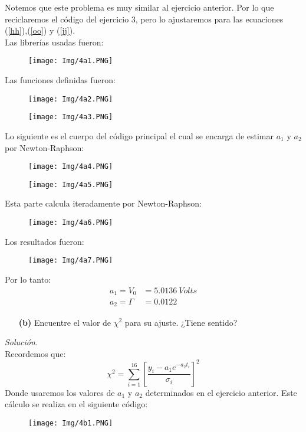 \documentclass[11pt]{article}
\begin{document}
	Notemos que este problema es muy similar al ejercicio anterior. Por lo que reciclaremos el código del ejercicio 3, pero lo ajustaremos para las ecuaciones (\ref{hh}),(\ref{oo}) y (\ref{jj}).\\
	Las librerías usadas fueron:
\newpage	
	\begin{figure}[h]
		\centering
		\texttt{[image: Img/4a1.PNG]}
	\end{figure}

	Las funciones definidas fueron:
	\begin{figure}[h]
		\centering
		\texttt{[image: Img/4a2.PNG]}
	\end{figure}
	\begin{figure}[h]
		\centering
		\texttt{[image: Img/4a3.PNG]}
	\end{figure}
	
	Lo siguiente es el cuerpo del código principal el cual se encarga de estimar $a_1$ y $a_2$ por Newton-Raphson:
\newpage
	\begin{figure}[h!]
		\centering
		\texttt{[image: Img/4a4.PNG]}
	\end{figure}
	\begin{figure}[h!]
		\centering
		\texttt{[image: Img/4a5.PNG]}
	\end{figure}
\newpage

	Esta parte calcula iteradamente por Newton-Raphson:
	
	\begin{figure}[h!]
		\centering
		\texttt{[image: Img/4a6.PNG]}
	\end{figure}
	
	Los resultados fueron:
	
	\begin{figure}[h!]
		\centering
		\texttt{[image: Img/4a7.PNG]}
	\end{figure}	
	
	Por lo tanto:
	\begin{align*}
		a_1 = V_0 &= \SI{5.0136}{Volts}	\\
		a_2 = \Gamma &= 0.0122
	\end{align*}
	
\newpage
	
\begin{enumerate}
	\item [\textbf{(b)}] Encuentre el valor de $\chi^2$ para su ajuste. ¿Tiene sentido?
\end{enumerate}	
	\textit{Solución.}\\
	Recordemos que:
	$$\chi^2 = \sum_{i=1}^{16} \left[\frac{y_i - a_1 e^{-a_2 t_i}}{\sigma_i}\right]^2$$
	Donde usaremos los valores de $a_1$ y $a_2$ determinados en el ejercicio anterior. Este cálculo se realiza en el siguiente código:
	\begin{figure}[h!]
		\centering
		\texttt{[image: Img/4b1.PNG]}
	\end{figure}
	
\end{document}
